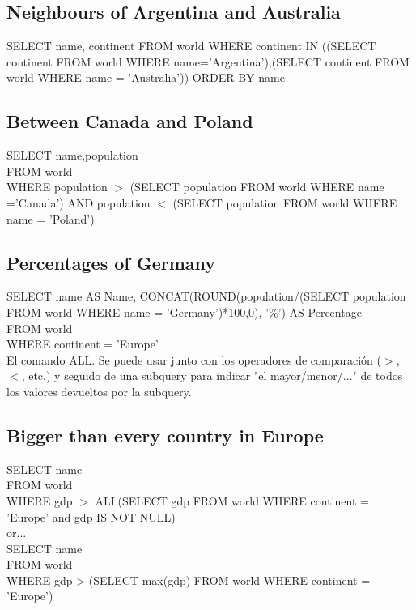 \documentclass[10pt, oneside]{article}
\begin{document}
\subsection{Neighbours of Argentina and Australia}

SELECT name, continent
FROM world
WHERE continent IN (\color{red}(SELECT continent FROM world WHERE name='Argentina')\color{black},\color{red}(SELECT continent FROM world WHERE name = 'Australia')\color{black})
ORDER BY name

\subsection{Between Canada and Poland}

SELECT name,population\\
FROM world\\
WHERE population $>$ (SELECT population FROM world WHERE name ='Canada') AND population $<$ (SELECT population FROM world WHERE name = 'Poland')\\

\subsection{Percentages of Germany}

SELECT name AS Name, CONCAT(ROUND(population/(SELECT population FROM world WHERE name = 'Germany')*100,0), '\%') AS Percentage\\
FROM world\\
WHERE continent = 'Europe'\\

\color{blue} El comando ALL. \color{black}Se puede usar junto con los operadores de comparación ($>$, $<$, etc.) y seguido de una subquery para indicar "el mayor/menor/..." de todos los valores devueltos por la subquery.

\subsection{Bigger than every country in Europe}

SELECT name\\
FROM world\\
WHERE gdp $>$ ALL(SELECT gdp FROM world WHERE continent = 'Europe' and gdp IS NOT NULL)\\

or...\\

SELECT name\\
FROM world\\
WHERE gdp > (SELECT max(gdp) FROM world WHERE continent = 'Europe')\\
\end{document}
